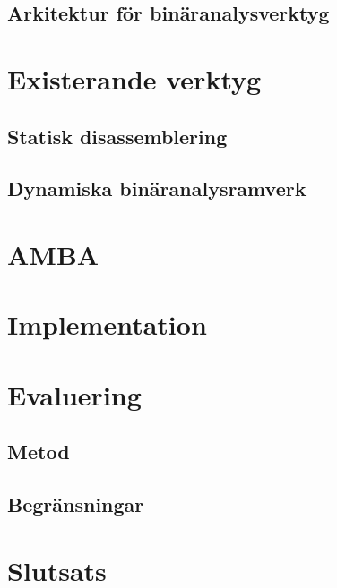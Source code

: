 \documentclass[12pt, a4paper]{report}
\begin{document}
\section{Arkitektur för binäranalysverktyg}


\chapter{Existerande verktyg}

\section{Statisk disassemblering}

\section{Dynamiska binäranalysramverk}


\chapter{AMBA}


\chapter{Implementation}


\chapter{Evaluering}

\section{Metod}

\section{Begränsningar}


\chapter{Slutsats}


\printbibliography{}
\end{document}
